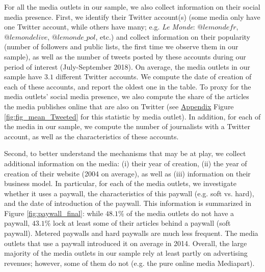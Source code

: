 For all the media outlets in our sample, we also collect information on their social media presence. First, we identify their Twitter account(s) (some media only have one Twitter account, while others have many; e.g. \textit{Le Monde}: $@lemondefr$, $@lemondelive$, $@lemonde\_pol$, etc.) and collect information on their popularity (number of followers and public lists, the first time we observe them in our sample), as well as  the number of tweets posted by these accounts during our period of interest (July-September 2018). On average, the media outlets in our sample have $3.1$ different Twitter accounts. We compute the date of creation of each of these accounts, and report the oldest one in the table. To proxy for the media outlets' social media presence,  we also compute the share of the articles the media publishes online that are also on Twitter (see \hyperlink{ref:Appendix}{Appendix} Figure \ref{fig:fig_mean_Tweeted} for this statistic by media outlet). In addition, for each of the media in our sample, we compute the number of journalists with a Twitter account, as well as the characteristics of these accounts.

Second, to better understand the mechanisms that may be at play, we collect additional information on the media: (i) their year of creation, (ii) the year of creation of their website (2004 on average), as well as (iii) information on their business model. In particular, for each of the media outlets, we investigate whether it uses a paywall, the characteristics of this paywall (e.g. soft vs. hard), and the date of introduction of the paywall. This information is summarized in Figure \ref{fig:paywall_final}: while $48.1\%$ of the media outlets do not have a paywall, $43.1\%$ lock at least some of their articles behind a paywall (soft paywall). Metered paywalls and hard paywalls are much less frequent. The media outlets that use a paywall introduced it on average in 2014. Overall, the large majority of the media outlets in our sample rely at least partly on advertising revenues; however, some of them do not (e.g. the pure online media Mediapart).


